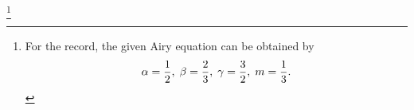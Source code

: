 \item

\notyet\footnote{%
For the record, the given Airy equation can be obtained by
\[
    \alpha = \frac{1}{2},\;
    \beta = \frac{2}{3},\;
    \gamma = \frac{3}{2},\;
    m = \frac{1}{3}.
\]
}